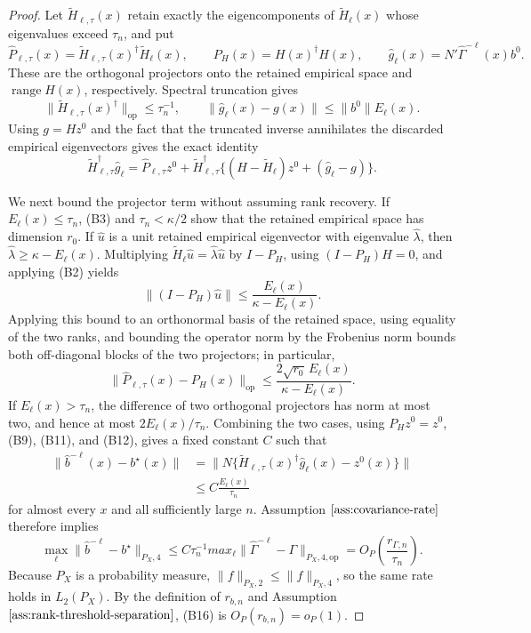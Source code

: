 \documentclass{article}
\begin{document}
\begin{proof}
Let \(\widetilde H_{\ell,\tau}(x)\) retain exactly the eigencomponents of \(\widetilde H_\ell(x)\) whose eigenvalues exceed \(\tau_n\), and put
\[
 \widehat P_{\ell,\tau}(x)
 =\widetilde H_{\ell,\tau}(x)^\dagger\widetilde H_\ell(x),
 \qquad
 P_H(x)=H(x)^\dagger H(x),
 \qquad
 \widehat g_\ell(x)=N'\widehat\Gamma^{-\ell}(x)b^0.
 \tag{B10}
\]
These are the orthogonal projectors onto the retained empirical space and \(\operatorname{range}H(x)\), respectively.  Spectral truncation gives
\[
 \|\widetilde H_{\ell,\tau}(x)^\dagger\|_{\mathrm{op}}
 \le\tau_n^{-1},
 \qquad
 \|\widehat g_\ell(x)-g(x)\|
 \le \|b^0\|E_\ell(x).
 \tag{B11}
\]
Using \(g=Hz^0\) and the fact that the truncated inverse annihilates the discarded empirical eigenvectors gives the exact identity
\[
 \widetilde H_{\ell,\tau}^\dagger\widehat g_\ell
 =\widehat P_{\ell,\tau}z^0
 +\widetilde H_{\ell,\tau}^\dagger
 \{(H-\widetilde H_\ell)z^0+(\widehat g_\ell-g)\}.
 \tag{B12}
\]

We next bound the projector term without assuming rank recovery.  If \(E_\ell(x)\le\tau_n\), (B3) and \(\tau_n<\kappa/2\) show that the retained empirical space has dimension \(r_0\).  If \(\widehat u\) is a unit retained empirical eigenvector with eigenvalue \(\widehat\lambda\), then \(\widehat\lambda\ge\kappa-E_\ell(x)\).  Multiplying
\(\widetilde H_\ell\widehat u=\widehat\lambda\widehat u\)
by \(I-P_H\), using \((I-P_H)H=0\), and applying (B2) yields
\[
 \|(I-P_H)\widehat u\|
 \le\frac{E_\ell(x)}{\kappa-E_\ell(x)}.
 \tag{B13}
\]
 Applying this bound to an orthonormal basis of the retained space, using equality of the two ranks, and bounding the operator norm by the Frobenius norm bounds both off-diagonal blocks of the two projectors; in particular,
\[
 \|\widehat P_{\ell,\tau}(x)-P_H(x)\|_{\mathrm{op}}
 \le\frac{2\sqrt{r_0}\,E_\ell(x)}{\kappa-E_\ell(x)}.
\tag{B14}
\]
If \(E_\ell(x)>\tau_n\), the difference of two orthogonal projectors has norm at most two, and hence at most \(2E_\ell(x)/\tau_n\).  Combining the two cases, using \(P_Hz^0=z^0\), (B9), (B11), and (B12), gives a fixed constant \(C\) such that
\[
 \begin{aligned}
 \|\widehat b^{-\ell}(x)-b^\star(x)\|
 &=\|N\{\widetilde H_{\ell,\tau}(x)^\dagger\widehat g_\ell(x)-z^0(x)\}\|\\
 &\le C\frac{E_\ell(x)}{\tau_n}
 \end{aligned}
 \tag{B15}
\]
for almost every \(x\) and all sufficiently large \(n\).  Assumption \(\ref{ass:covariance-rate}\) therefore implies
\[
 \max_\ell\|\widehat b^{-\ell}-b^\star\|_{P_X,4}
 \le C\tau_n^{-1}max_\ell\|\widehat\Gamma^{-\ell}-\Gamma\|_{P_X,4,\mathrm{op}}
 =O_P\!\left(\frac{r_{\Gamma,n}}{\tau_n}\right).
 \tag{B16}
\]
Because \(P_X\) is a probability measure, \(\|f\|_{P_X,2}\le\|f\|_{P_X,4}\), so the same rate holds in \(L_2(P_X)\).  By the definition of \(r_{b,n}\) and Assumption \(\ref{ass:rank-threshold-separation}\), (B16) is \(O_P(r_{b,n})=o_P(1)\).


\end{proof}
\end{document}
